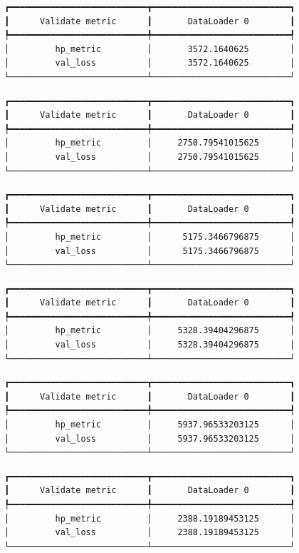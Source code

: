 \documentclass[
  letterpaper,
  DIV=11,
  numbers=noendperiod]{scrreprt}
\begin{document}
\begin{verbatim}
┏━━━━━━━━━━━━━━━━━━━━━━━━━━━┳━━━━━━━━━━━━━━━━━━━━━━━━━━━┓
┃      Validate metric      ┃       DataLoader 0        ┃
┡━━━━━━━━━━━━━━━━━━━━━━━━━━━╇━━━━━━━━━━━━━━━━━━━━━━━━━━━┩
│         hp_metric         │       3572.1640625        │
│         val_loss          │       3572.1640625        │
└───────────────────────────┴───────────────────────────┘
\end{verbatim}

\begin{verbatim}
┏━━━━━━━━━━━━━━━━━━━━━━━━━━━┳━━━━━━━━━━━━━━━━━━━━━━━━━━━┓
┃      Validate metric      ┃       DataLoader 0        ┃
┡━━━━━━━━━━━━━━━━━━━━━━━━━━━╇━━━━━━━━━━━━━━━━━━━━━━━━━━━┩
│         hp_metric         │     2750.79541015625      │
│         val_loss          │     2750.79541015625      │
└───────────────────────────┴───────────────────────────┘
\end{verbatim}

\begin{verbatim}
┏━━━━━━━━━━━━━━━━━━━━━━━━━━━┳━━━━━━━━━━━━━━━━━━━━━━━━━━━┓
┃      Validate metric      ┃       DataLoader 0        ┃
┡━━━━━━━━━━━━━━━━━━━━━━━━━━━╇━━━━━━━━━━━━━━━━━━━━━━━━━━━┩
│         hp_metric         │      5175.3466796875      │
│         val_loss          │      5175.3466796875      │
└───────────────────────────┴───────────────────────────┘
\end{verbatim}

\begin{verbatim}
┏━━━━━━━━━━━━━━━━━━━━━━━━━━━┳━━━━━━━━━━━━━━━━━━━━━━━━━━━┓
┃      Validate metric      ┃       DataLoader 0        ┃
┡━━━━━━━━━━━━━━━━━━━━━━━━━━━╇━━━━━━━━━━━━━━━━━━━━━━━━━━━┩
│         hp_metric         │     5328.39404296875      │
│         val_loss          │     5328.39404296875      │
└───────────────────────────┴───────────────────────────┘
\end{verbatim}

\begin{verbatim}
┏━━━━━━━━━━━━━━━━━━━━━━━━━━━┳━━━━━━━━━━━━━━━━━━━━━━━━━━━┓
┃      Validate metric      ┃       DataLoader 0        ┃
┡━━━━━━━━━━━━━━━━━━━━━━━━━━━╇━━━━━━━━━━━━━━━━━━━━━━━━━━━┩
│         hp_metric         │     5937.96533203125      │
│         val_loss          │     5937.96533203125      │
└───────────────────────────┴───────────────────────────┘
\end{verbatim}

\begin{verbatim}
┏━━━━━━━━━━━━━━━━━━━━━━━━━━━┳━━━━━━━━━━━━━━━━━━━━━━━━━━━┓
┃      Validate metric      ┃       DataLoader 0        ┃
┡━━━━━━━━━━━━━━━━━━━━━━━━━━━╇━━━━━━━━━━━━━━━━━━━━━━━━━━━┩
│         hp_metric         │     2388.19189453125      │
│         val_loss          │     2388.19189453125      │
└───────────────────────────┴───────────────────────────┘
\end{verbatim}
\end{document}

